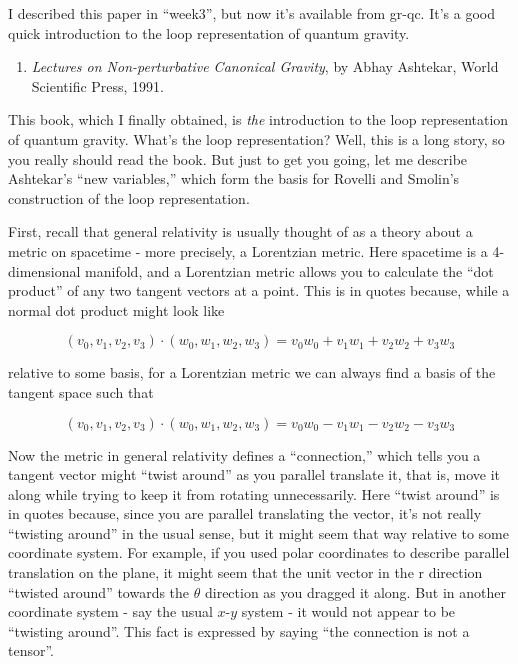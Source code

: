 \documentclass{article}
\def\tightlist{}
\renewcommand{\texttt}[1]{%
  \begingroup
  \ttfamily
  \begingroup\lccode`~=`/\lowercase{\endgroup\def~}{/\discretionary{}{}{}}%
  \begingroup\lccode`~=`[\lowercase{\endgroup\def~}{[\discretionary{}{}{}}%
  \begingroup\lccode`~=`.\lowercase{\endgroup\def~}{.\discretionary{}{}{}}%
  \catcode`/=\active\catcode`[=\active\catcode`.=\active
  \scantokens{#1\noexpand}%
  \endgroup
}
\begin{document}

I described this paper in ``week3'', but now it's available from gr-qc.
It's a good quick introduction to the loop representation of quantum
gravity.

\begin{enumerate}
\def\labelenumi{\arabic{enumi})}
\setcounter{enumi}{1}
\tightlist
\item
  \emph{Lectures on Non-perturbative Canonical Gravity}, by Abhay
  Ashtekar, World Scientific Press, 1991.
\end{enumerate}

This book, which I finally obtained, is \emph{the} introduction to the
loop representation of quantum gravity. What's the loop representation?
Well, this is a long story, so you really should read the book. But just
to get you going, let me describe Ashtekar's ``new variables,'' which
form the basis for Rovelli and Smolin's construction of the loop
representation.

First, recall that general relativity is usually thought of as a theory
about a metric on spacetime - more precisely, a Lorentzian metric. Here
spacetime is a 4-dimensional manifold, and a Lorentzian metric allows
you to calculate the ``dot product'' of any two tangent vectors at a
point. This is in quotes because, while a normal dot product might look
like

\[(v_0,v_1,v_2,v_3)\cdot(w_0,w_1,w_2,w_3) = v_0w_0 + v_1w_1 + v_2w_2 + v_3w_3\]

relative to some basis, for a Lorentzian metric we can always find a
basis of the tangent space such that

\[(v_0,v_1,v_2,v_3)\cdot(w_0,w_1,w_2,w_3) = v_0w_0 - v_1w_1 - v_2w_2 - v_3w_3\]

Now the metric in general relativity defines a ``connection,'' which
tells you a tangent vector might ``twist around'' as you parallel
translate it, that is, move it along while trying to keep it from
rotating unnecessarily. Here ``twist around'' is in quotes because,
since you are parallel translating the vector, it's not really
``twisting around'' in the usual sense, but it might seem that way
relative to some coordinate system. For example, if you used polar
coordinates to describe parallel translation on the plane, it might seem
that the unit vector in the r direction ``twisted around'' towards the
\(\theta\) direction as you dragged it along. But in another coordinate
system - say the usual \(x\)-\(y\) system - it would not appear to be
``twisting around''. This fact is expressed by saying ``the connection
is not a tensor''.
\end{document}
